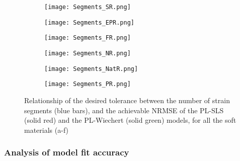 \begin{figure}[htb!]
    \centering
    \begin{subfigure}[b]{0.49\textwidth}
        \centering
        \texttt{[image: Segments\_SR.png]}
        \caption{}
        \label{fig:SegmentsSR}
    \end{subfigure}
    \begin{subfigure}[b]{0.49\textwidth}
        \centering
        \texttt{[image: Segments\_EPR.png]}
        \caption{}
        \label{fig:SegmentsEPR}
    \end{subfigure}
    \begin{subfigure}[b]{0.49\textwidth}
        \centering
        \texttt{[image: Segments\_FR.png]}
        \caption{}
        \label{fig:SegmentsFR}
    \end{subfigure}
    \begin{subfigure}[b]{0.49\textwidth}
        \centering
        \texttt{[image: Segments\_NR.png]}
        \caption{}
        \label{fig:SegmentsNR}
    \end{subfigure}
    \begin{subfigure}[b]{0.49\textwidth}
        \centering
        \texttt{[image: Segments\_NatR.png]}
        \caption{}
        \label{fig:SegmentsNatR}
    \end{subfigure}
    \begin{subfigure}[b]{0.49\textwidth}
        \centering
        \texttt{[image: Segments\_PR.png]}
        \caption{}
        \label{fig:SegmentsPR}
    \end{subfigure}
    \caption{Relationship of the desired tolerance between the number of strain segments (blue bars), and the achievable NRMSE of the PL-SLS (solid red) and the PL-Wiechert (solid green) models, for all the soft materials (a-f) \cite{solis2018assessment}}
    \label{fig:SegmentsAll}
\end{figure}

\subsubsection{Analysis of model fit accuracy} \label{ModelfitAnalysis}


